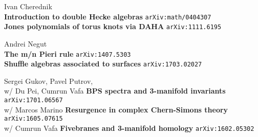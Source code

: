 \documentclass[12pt]{article}
\begin{document}
\begin{thebibliography}{}
\item Ivan Cherednik \\
\textbf{Introduction to double Hecke algebras} \texttt{arXiv:math/0404307} \\
\textbf{Jones polynomials of torus knots via DAHA} \texttt{arXiv:1111.6195}

\item Andrei Negut \\
\textbf{The m/n Pieri rule} \texttt{arXiv:1407.5303} \\
\textbf{Shuffle algebras associated to surfaces} \texttt{arXiv:1703.02027}

\item Sergei Gukov, Pavel Putrov, \\
w/ Du Pei, Cumrun Vafa \hspace{1em} \textbf{BPS spectra and 3-manifold invariants} \hspace{3.5em} \texttt{arXiv:1701.06567} \\
w/ Marcos Marino \hspace{3.5em} \textbf{Resurgence in complex Chern-Simons theory} \texttt{arXiv:1605.07615} \\
w/ Cumrun Vafa \hspace{4em} \textbf{Fivebranes and 3-manifold homology} \hspace{3.5em}\texttt{arXiv:1602.05302} 
\end{thebibliography}
\end{document}
